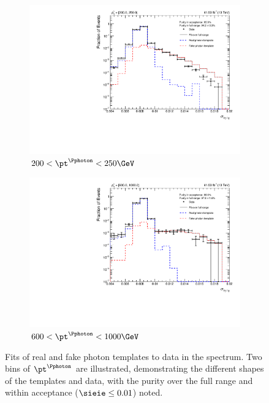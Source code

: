 \begin{figure}[H]
    \centering
    \begin{subfigure}[b]{0.42\textwidth}
        \includegraphics[width=\textwidth]{figures/photon_purity/2017/fit_200.0_to_250.0.pdf}
        \caption{$\text{200} < \pt^{\Pphoton} < \text{250\GeV}$}
    \end{subfigure}
    \hspace{0.1\textwidth}
    \begin{subfigure}[b]{0.42\textwidth}
        \includegraphics[width=\textwidth]{figures/photon_purity/2017/fit_600.0_to_1000.0.pdf}
        \caption{$\text{600} < \pt^{\Pphoton} < \text{1000\GeV}$}
    \end{subfigure}
    \caption[Fits of real and fake photon templates to data in the \sieie spectrum]{Fits of real and fake photon templates to data in the \sieie spectrum. Two bins of $\pt^{\Pphoton}$ are illustrated, demonstrating the different shapes of the templates and data, with the purity over the full range and within acceptance ($\sieie \leq \text{0.01}$) noted.}
    \label{fig:htoinv_photon_purity_fits}
\end{figure}

